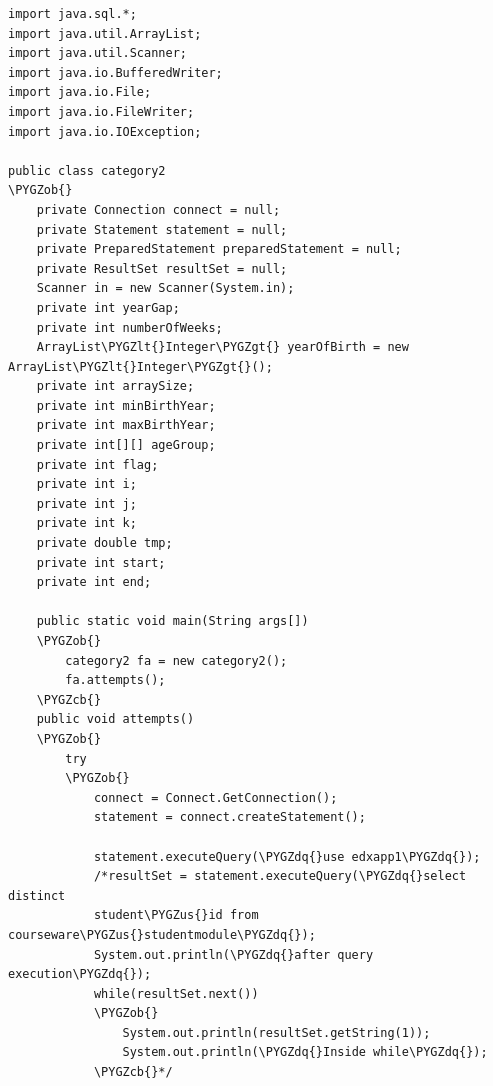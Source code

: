 \documentclass[a4paper,12pt,oneside]{sphinxmanual}
\def\PYGZus{\char`\_}
\def\PYGZob{\char`\{}
\def\PYGZcb{\char`\}}
\def\PYGZlt{\char`\<}
\def\PYGZgt{\char`\>}
\def\PYGZdq{\char`\"}
\begin{document}
\begin{Verbatim}[commandchars=\\\{\}]
import java.sql.*;
import java.util.ArrayList;
import java.util.Scanner;
import java.io.BufferedWriter;
import java.io.File;
import java.io.FileWriter;
import java.io.IOException;

public class category2
\PYGZob{}
    private Connection connect = null;
    private Statement statement = null;
    private PreparedStatement preparedStatement = null;
    private ResultSet resultSet = null;
    Scanner in = new Scanner(System.in);
    private int yearGap;
    private int numberOfWeeks;
    ArrayList\PYGZlt{}Integer\PYGZgt{} yearOfBirth = new ArrayList\PYGZlt{}Integer\PYGZgt{}();
    private int arraySize;
    private int minBirthYear;
    private int maxBirthYear;
    private int[][] ageGroup;
    private int flag;
    private int i;
    private int j;
    private int k;
    private double tmp;
    private int start;
    private int end;

    public static void main(String args[])
    \PYGZob{}
        category2 fa = new category2();
        fa.attempts();
    \PYGZcb{}
    public void attempts()
    \PYGZob{}
        try
        \PYGZob{}
            connect = Connect.GetConnection();
            statement = connect.createStatement();

            statement.executeQuery(\PYGZdq{}use edxapp1\PYGZdq{});
            /*resultSet = statement.executeQuery(\PYGZdq{}select distinct
            student\PYGZus{}id from courseware\PYGZus{}studentmodule\PYGZdq{});
            System.out.println(\PYGZdq{}after query execution\PYGZdq{});
            while(resultSet.next())
            \PYGZob{}
                System.out.println(resultSet.getString(1));
                System.out.println(\PYGZdq{}Inside while\PYGZdq{});
            \PYGZcb{}*/




\end{Verbatim}
\end{document}

